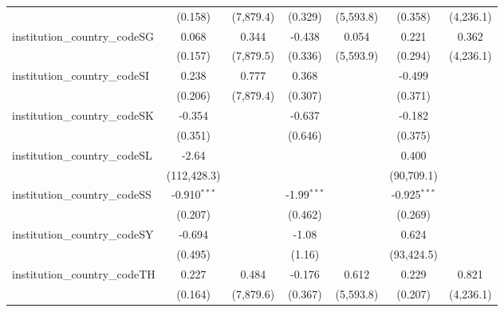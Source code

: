 \begin{tabular}{lcccccc}
                                         & (0.158)        & (7,879.4)     & (0.329)        & (5,593.8)     & (0.358)        & (4,236.1)\\   
   institution\_country\_codeSG          & 0.068          & 0.344         & -0.438         & 0.054         & 0.221          & 0.362\\   
                                         & (0.157)        & (7,879.5)     & (0.336)        & (5,593.9)     & (0.294)        & (4,236.1)\\   
   institution\_country\_codeSI          & 0.238          & 0.777         & 0.368          &               & -0.499         &   \\   
                                         & (0.206)        & (7,879.4)     & (0.307)        &               & (0.371)        &   \\   
   institution\_country\_codeSK          & -0.354         &               & -0.637         &               & -0.182         &   \\   
                                         & (0.351)        &               & (0.646)        &               & (0.375)        &   \\   
   institution\_country\_codeSL          & -2.64          &               &                &               & 0.400          &   \\   
                                         & (112,428.3)    &               &                &               & (90,709.1)     &   \\   
   institution\_country\_codeSS          & -0.910$^{***}$ &               & -1.99$^{***}$  &               & -0.925$^{***}$ &   \\   
                                         & (0.207)        &               & (0.462)        &               & (0.269)        &   \\   
   institution\_country\_codeSY          & -0.694         &               & -1.08          &               & 0.624          &   \\   
                                         & (0.495)        &               & (1.16)         &               & (93,424.5)     &   \\   
   institution\_country\_codeTH          & 0.227          & 0.484         & -0.176         & 0.612         & 0.229          & 0.821\\   
                                         & (0.164)        & (7,879.6)     & (0.367)        & (5,593.8)     & (0.207)        & (4,236.1)\\   

\end{tabular}
